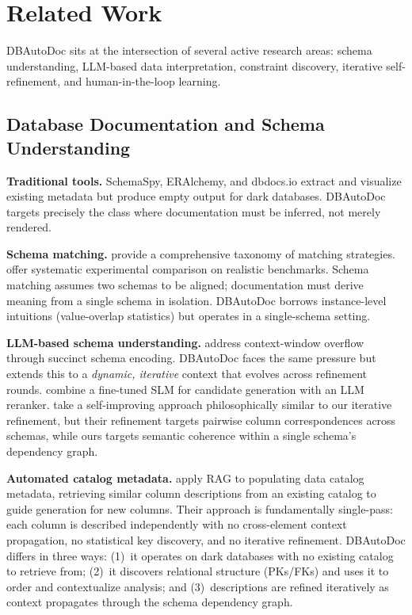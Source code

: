 \documentclass[twocolumn]{svjour3}
\begin{document}
\section{Related Work}\label{sec:related}

DBAutoDoc sits at the intersection of several active research areas: schema understanding, LLM-based data interpretation, constraint discovery, iterative self-refinement, and human-in-the-loop learning.

\subsection{Database Documentation and Schema Understanding}

\textbf{Traditional tools.} SchemaSpy, ERAlchemy, and dbdocs.io extract and visualize existing metadata but produce empty output for dark databases. DBAutoDoc targets precisely the class where documentation must be inferred, not merely rendered.

\textbf{Schema matching.} \cite{rahm2001survey} provide a comprehensive taxonomy of matching strategies. \cite{koutras2021valentine} offer systematic experimental comparison on realistic benchmarks. Schema matching assumes two schemas to be aligned; documentation must derive meaning from a single schema in isolation. DBAutoDoc borrows instance-level intuitions (value-overlap statistics) but operates in a single-schema setting.

\textbf{LLM-based schema understanding.} \cite{trummer2024succinct} address context-window overflow through succinct schema encoding. DBAutoDoc faces the same pressure but extends this to a \emph{dynamic, iterative} context that evolves across refinement rounds. \cite{liu2025magneto} combine a fine-tuned SLM for candidate generation with an LLM reranker. \cite{seedat2024matchmaker} take a self-improving approach philosophically similar to our iterative refinement, but their refinement targets pairwise column correspondences across schemas, while ours targets semantic coherence within a single schema's dependency graph.

\textbf{Automated catalog metadata.} \cite{ragleveraging2025} apply RAG to populating data catalog metadata, retrieving similar column descriptions from an existing catalog to guide generation for new columns. Their approach is fundamentally single-pass: each column is described independently with no cross-element context propagation, no statistical key discovery, and no iterative refinement. DBAutoDoc differs in three ways: (1)~it operates on dark databases with no existing catalog to retrieve from; (2)~it discovers relational structure (PKs/FKs) and uses it to order and contextualize analysis; and (3)~descriptions are refined iteratively as context propagates through the schema dependency graph.
\end{document}
